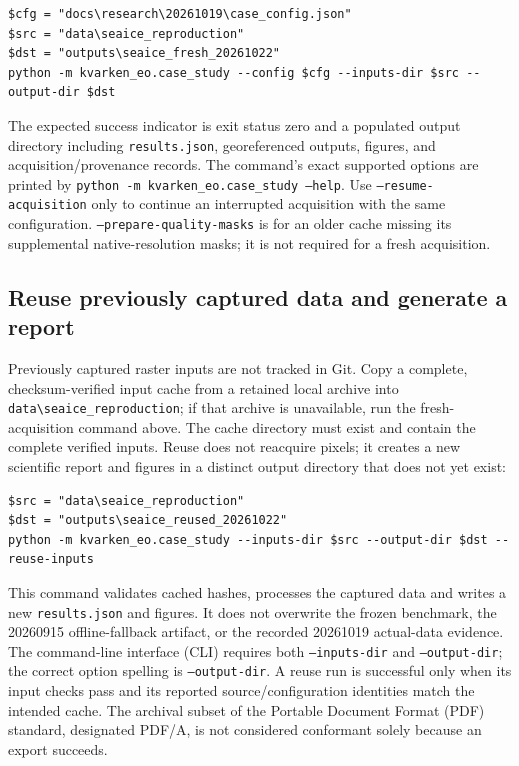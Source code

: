 \begin{verbatim}
$cfg = "docs\research\20261019\case_config.json"
$src = "data\seaice_reproduction"
$dst = "outputs\seaice_fresh_20261022"
python -m kvarken_eo.case_study --config $cfg --inputs-dir $src --output-dir $dst
\end{verbatim}

The expected success indicator is exit status zero and a populated output directory including
\texttt{results.json}, georeferenced outputs, figures, and acquisition/provenance records.
The command's exact supported options are printed by
\texttt{python -m kvarken\_eo.case\_study --help}. Use
\texttt{--resume-acquisition} only to continue an interrupted acquisition with the same
configuration. \texttt{--prepare-quality-masks} is for an older cache missing its supplemental
native-resolution masks; it is not required for a fresh acquisition.

\subsection{Reuse previously captured data and generate a report}

Previously captured raster inputs are not tracked in Git. Copy a complete, checksum-verified
input cache from a retained local archive into
\texttt{data\textbackslash{}seaice\_reproduction}; if that archive is unavailable, run the fresh-acquisition command
above. The cache directory must exist and contain the complete verified inputs. Reuse does not
reacquire pixels; it creates a new scientific report and figures in a distinct output directory
that does not yet exist:

\begin{verbatim}
$src = "data\seaice_reproduction"
$dst = "outputs\seaice_reused_20261022"
python -m kvarken_eo.case_study --inputs-dir $src --output-dir $dst --reuse-inputs
\end{verbatim}

This command validates cached hashes, processes the captured data and writes a new
\texttt{results.json} and figures. It does not overwrite the frozen benchmark, the 20260915
offline-fallback artifact, or the recorded 20261019 actual-data evidence. The command-line
interface (CLI) requires
both \texttt{--inputs-dir} and \texttt{--output-dir}; the correct option spelling is
\texttt{--output-dir}. A reuse run is successful only when its input checks pass and its
reported source/configuration identities match the intended cache. The archival subset of the
Portable Document Format (PDF) standard, designated PDF/A, is not considered conformant solely
because an export succeeds.

